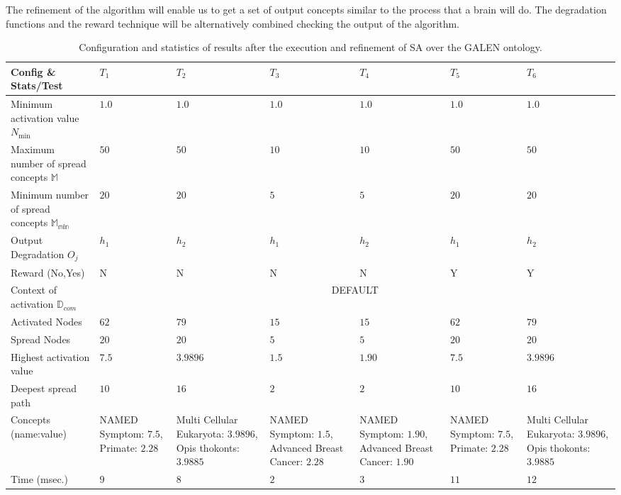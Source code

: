 The refinement of the algorithm will enable us to get
a set of output concepts similar to the process that a brain will do. The degradation functions
and the reward technique will be alternatively combined checking the output of the algorithm. 

\begin{table*}[p]
\renewcommand{\arraystretch}{1.3}
\begin{center}
\begin{tabular}{|p{3cm}|p{1.5cm}|p{1.5cm}|p{1.5cm}|p{1.5cm}|p{1.5cm}|p{1.5cm}|}
\hline
        \textbf{Config \& Stats/Test}&$T_1$&$T_2$&$T_3$&$T_4$&$T_5$&$T_6$\\ \hline
        \hline
        Minimum activation value $N_{\min}$ &$1.0$ &$1.0$ &$1.0$ &$1.0$&$1.0$&$1.0$ \\ \hline
	Maximum number of spread concepts $\mathbb{M}$&$50$ &$50$ &$10$ &$10$&$50$&$50$\\ \hline
	Minimum number of spread concepts $\mathbb{M_{\min}}$&$20$ &$20$ &$5$ &$5$&$20$&$20$  \\ \hline
	Output Degradation $O_j$ & $h_1$ &$h_2$ &$h_1$ &$h_2$&$h_1$&$h_2$\\ \hline
	Reward (No,Yes) &N &N &N &N&Y&Y\\ \hline
	\hline
	Context of activation $\mathbb{D}_{com}$&\multicolumn{6}{|c|}{DEFAULT} \\ \hline
	Activated Nodes &$62$ &$79$ &$15$ &$15$&$62$&$79$ \\ \hline
	Spread Nodes &$20$ &$20$ &$5$ &$5$&$20$&$20$ \\ \hline
	Highest activation value &$7.5$ &$3.9896$ &$1.5$ &$1.90$&$7.5$&$3.9896$\\ \hline
	Deepest spread path &$10$ &$16$&$2$ &$2$&$10$&$16$\\ \hline
	Concepts (name:value) & NAMED Symptom: $7.5$, Primate: $2.28$ &Multi Cellular Eukaryota: $3.9896$, Opis thokonts: $3.9885$ &NAMED Symptom: $1.5$, Advanced Breast Cancer: $2.28$ &NAMED Symptom: $1.90$, Advanced Breast Cancer: $1.90$&NAMED Symptom: $7.5$, Primate: $2.28$&Multi Cellular Eukaryota: $3.9896$, Opis thokonts: $3.9885$ \\ \hline
	Time (msec.) & $9$ &$8$ &$2$ &$3$&$11$&$12$ \\ \hline
\end{tabular}
  \caption{Configuration and statistics of results after the execution and refinement of SA over the GALEN ontology.}
  \label{tabla:test-restricciones}
  \end{center}
\end{table*} 



